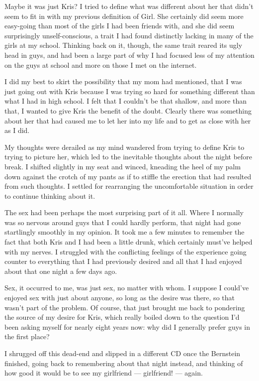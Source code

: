 Maybe it was just Kris?  I tried to define what was different about her that didn't seem to fit in with my previous definition of Girl.  She certainly did seem more easy-going than most of the girls I had been friends with, and she did seem surprisingly unself-conscious, a trait I had found distinctly lacking in many of the girls at my school.  Thinking back on it, though, the same trait reared its ugly head in guys, and had been a large part of why I had focused less of my attention on the guys at school and more on those I met on the internet.

I did my best to skirt the possibility that my mom had mentioned, that I was just going out with Kris because I was trying so hard for something different than what I had in high school.  I felt that I couldn't be that shallow, and more than that, I wanted to give Kris the benefit of the doubt.  Clearly there was something about her that had caused me to let her into my life and to get as close with her as I did.

My thoughts were derailed as my mind wandered from trying to define Kris to trying to picture her, which led to the inevitable thoughts about the night before break.  I shifted slightly in my seat and winced, kneading the heel of my palm down against the crotch of my pants as if to stiffle the erection that had resulted from such thoughts.  I settled for rearranging the uncomfortable situation in order to continue thinking about it.

The sex had been perhaps the most surprising part of it all.  Where I normally was so nervous around guys that I could hardly perform, that night had gone startlingly smoothly in my opinion.  It took me a few minutes to remember the fact that both Kris and I had been a little drunk, which certainly must've helped with my nerves.  I struggled with the conflicting feelings of the experience going counter to everything that I had previously desired and all that I had enjoyed about that one night a few days ago.

Sex, it occurred to me, was just sex, no matter with whom.  I suppose I could've enjoyed sex with just about anyone, so long as the desire was there, so that wasn't part of the problem.  Of course, that just brought me back to pondering the source of my desire for Kris, which really boiled down to the question I'd been asking myself for nearly eight years now: why did I generally prefer guys in the first place?

I shrugged off this dead-end and slipped in a different CD once the Bernstein finished, going back to remembering about that night instead, and thinking of how good it would be to see my girlfriend --- girlfriend! --- again.
